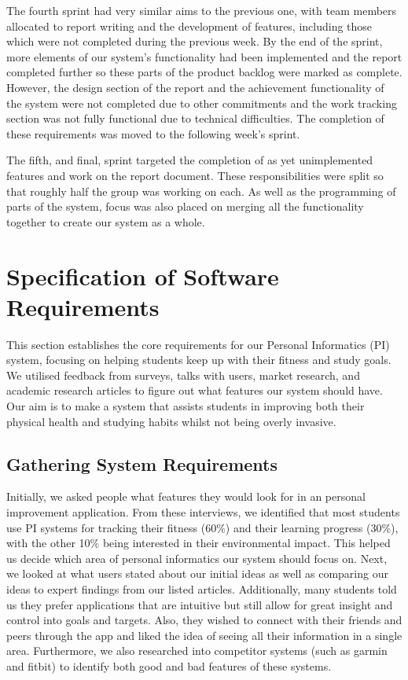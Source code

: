 \documentclass[12pt]{article}
\begin{document}
The fourth sprint had very similar aims to the previous one, with team members allocated to report writing and the development of features, including those which were not completed during the previous week. By the end of the sprint, more elements of our system's functionality had been implemented and the report completed further so these parts of the product backlog were marked as complete. However, the design section of the report and the achievement functionality of the system were not completed due to other commitments and the work tracking section was not fully functional due to technical difficulties. The completion of these requirements was moved to the following week's sprint.\par

The fifth, and final, sprint targeted the completion of as yet unimplemented features and work on the report document. These responsibilities were split so that roughly half the group was working on each. As well as the programming of parts of the system, focus was also placed on merging all the functionality together to create our system as a whole.


\newpage
\section{Specification of Software Requirements}

This section establishes the core requirements for our Personal Informatics
(PI) system, focusing on helping students keep up with their fitness and study
goals. We utilised feedback from surveys, talks with users, market research,
and academic research articles to figure out what features our system should have. Our
aim is to make a system that assists students in improving both their physical
health and studying habits whilst not being overly invasive.


\subsection{Gathering System Requirements}

Initially, we asked people what features they would look for in an personal
improvement application. From these interviews, we identified that most students use PI systems for
tracking their fitness (60\%) and their learning progress (30\%), with the other 10\% being interested in their environmental impact. This
helped us decide which area of personal informatics our system should focus on. Next, we looked
at what users stated about our initial ideas as well as comparing our ideas
to expert findings from our listed articles. Additionally, many students told us they prefer applications
that are intuitive but still allow for great insight and control into goals
and targets. Also, they wished to connect with their friends and peers through the app and
liked the idea of seeing all their information in a single area. Furthermore, we also researched into competitor 
systems (such as garmin and fitbit) to identify both good and bad features of these systems.\par
\end{document}
